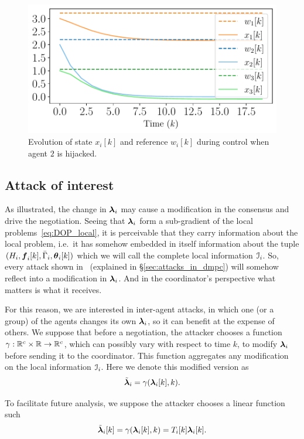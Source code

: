 \documentclass[../main.tex]{subfiles}
\begin{document}
\begin{figure}[h]
  \centering
  \includegraphics[width=.5\textwidth]{../img/example_liar_state.pdf}
  \caption{Evolution of state $x_{i}[k]$ and reference $w_{i}[k]$ during control when agent $2$ is hijacked. }\label{fig:example_liar_state}
\end{figure}

\subsection{Attack of interest}\label{sec:attack-interest}

As illustrated, the change in $\boldsymbol{\lambda}_i$ may cause a modification in the consensus and drive the negotiation.
Seeing that $\boldsymbol{\lambda}_i$ form a sub-gradient of the local problems~\eqref{eq:DOP_local}, it is perceivable that they carry information about the local problem, i.e.\ it has somehow embedded in itself information about the tuple $(H_{i},\vec{f}_{i}[k],\bar{\Gamma}_{i},\thetaik)$ which we will call the complete local information $\mathcal{I}_{i}$.
So, every attack shown in~\cite{VelardeEtAl2018} (explained in \S\ref{sec:attacks_in_dmpc}) will somehow reflect into a modification in $\boldsymbol{\lambda}_i$.
And in the coordinator's perspective what matters is what it receives.

For this reason, we are interested in inter-agent \fdi{} attacks, in which one (or a group) of the agents changes its own $\boldsymbol{\lambda}_i$, so it can benefit at the expense of others.
We suppose that before a negotiation, the attacker chooses a function ${\gamma:\mathbb{R}^{c}\times\mathbb{R}\to \mathbb{R}^{c}}$, which can possibly vary with respect to time $k$, to modify $\boldsymbol{\lambda}_i$ before sending it to the coordinator.
This function aggregates any modification on the local information $\mathcal{I}_{i}$.
Here we denote this modified version as
\begin{equation}
  \tilde{\vec{\lambda}}_{i}=\gamma(\lambdaik,k).
\end{equation}

To facilitate future analysis, we suppose the attacker chooses a linear function such
\begin{equation}
  \label{eq:linear_attack}
  \tilde{\vec{\lambda}}_{i}[k]=\gamma(\lambdaik,k)=\Tik\lambdaik.
\end{equation}
\end{document}
